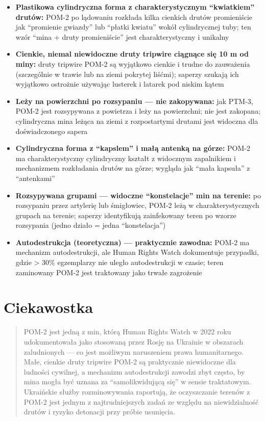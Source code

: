 \documentclass[12pt,openany,oneside]{book}
\providecommand{\tightlist}{%
  \setlength{\itemsep}{0pt}\setlength{\parskip}{0pt}}
\begin{document}
\begin{itemize}
\tightlist
\item
  \textbf{Plastikowa cylindryczna forma z charakterystycznym
  ``kwiatkiem'' drutów:} POM-2 po lądowaniu rozkłada kilka cienkich
  drutów promieniście jak ``promienie gwiazdy'' lub ``płatki kwiatu''
  wokół cylindrycznej tuby; ten wzór ``mina + druty promieniście'' jest
  charakterystyczny i unikalny
\item
  \textbf{Cienkie, niemal niewidoczne druty tripwire ciągnące się 10 m
  od miny:} druty tripwire POM-2 są wyjątkowo cienkie i trudne do
  zauważenia (szczególnie w trawie lub na ziemi pokrytej liśćmi);
  saperzy szukają ich wyjątkowo ostrożnie używając lusterek i latarek
  pod niskim kątem
\item
  \textbf{Leży na powierzchni po rozsypaniu --- nie zakopywana:} jak
  PTM-3, POM-2 jest rozsypywana z powietrza i leży na powierzchni; nie
  jest zakopana; cylindryczna mina leżąca na ziemi z rozpostartymi
  drutami jest widoczna dla doświadczonego sapera
\item
  \textbf{Cylindryczna forma z ``kapslem'' i małą antenką na górze:}
  POM-2 ma charakterystyczny cylindryczny kształt z widocznym
  zapalnikiem i mechanizmem rozkładania drutów na górze; wygląda jak
  ``mała kapsuła'' z ``antenkami''
\item
  \textbf{Rozsypywana grupami --- widoczne ``konstelacje'' min na
  terenie:} po rozsypaniu przez artylerię lub śmigłowiec, POM-2 leżą w
  charakterystycznych grupach na terenie; saperzy identyfikują
  zainfekowany teren po wzorze rozsypania (jedno działo = jedna
  ``konstelacja'')
\item
  \textbf{Autodestrukcja (teoretyczna) --- praktycznie zawodna:} POM-2
  ma mechanizm autodestrukcji, ale Human Rights Watch dokumentuje
  przypadki, gdzie \textgreater{} 30\% egzemplarzy nie uległo
  autodestrukcji w czasie; teren zaminowany POM-2 jest traktowany jako
  trwałe zagrożenie
\end{itemize}

\section{Ciekawostka}\label{ciekawostka-110}

\begin{quote}
POM-2 jest jedną z min, którą Human Rights Watch w 2022 roku
udokumentowała jako stosowaną przez Rosję na Ukrainie w obszarach
zaludnionych --- co jest możliwym naruszeniem prawa humanitarnego. Małe,
cienkie druty tripwire POM-2 są praktycznie niewidoczne dla ludności
cywilnej, a mechanizm autodestrukcji zawodzi zbyt często, by mina mogła
być uznana za ``samolikwidującą się'' w sensie traktatowym. Ukraińskie
służby rozminowywania raportują, że oczyszczanie terenów z POM-2 jest
jednym z najtrudniejszych zadań ze względu na niewidzialność drutów i
ryzyko detonacji przy próbie usunięcia.
\end{quote}
\end{document}
